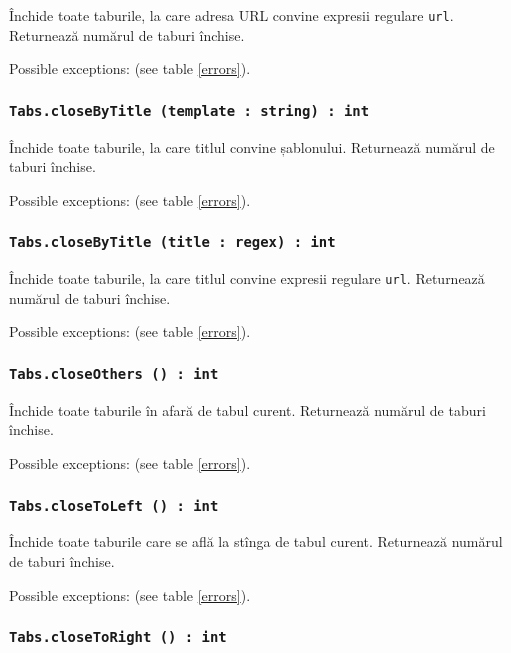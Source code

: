 Închide toate taburile, la care adresa URL convine expresii regulare \texttt{url}. Returnează numărul de taburi închise.

Possible exceptions:  (see table \ref{errors}).

\subsubsection{\texttt{Tabs.closeByTitle (template : string) : int}}

Închide toate taburile, la care titlul convine șablonului. Returnează numărul de taburi închise.

Possible exceptions:  (see table \ref{errors}).

\subsubsection{\texttt{Tabs.closeByTitle (title : regex) : int}}

Închide toate taburile, la care titlul convine expresii regulare \texttt{url}. Returnează numărul de taburi închise.

Possible exceptions:  (see table \ref{errors}).

\subsubsection{\texttt{Tabs.closeOthers () : int}}

Închide toate taburile în afară de tabul curent. Returnează numărul de taburi închise.

Possible exceptions:  (see table \ref{errors}).

\subsubsection{\texttt{Tabs.closeToLeft () : int}}

Închide toate taburile care se află la stînga de tabul curent. Returnează numărul de taburi închise.

Possible exceptions:  (see table \ref{errors}).

\subsubsection{\texttt{Tabs.closeToRight () : int}}

